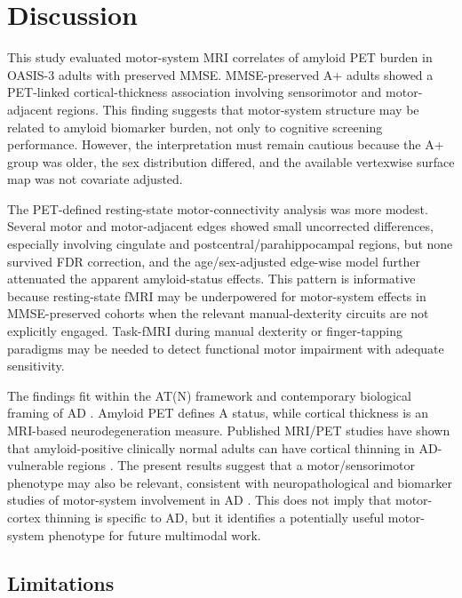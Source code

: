 \documentclass[review,3p,times,12pt,letterpaper]{elsarticle}
\begin{document}
\section{Discussion}

This study evaluated motor-system MRI correlates of amyloid PET burden in OASIS-3 adults with preserved MMSE. MMSE-preserved A+ adults showed a PET-linked cortical-thickness association involving sensorimotor and motor-adjacent regions. This finding suggests that motor-system structure may be related to amyloid biomarker burden, not only to cognitive screening performance. However, the interpretation must remain cautious because the A+ group was older, the sex distribution differed, and the available vertexwise surface map was not covariate adjusted.

The PET-defined resting-state motor-connectivity analysis was more modest. Several motor and motor-adjacent edges showed small uncorrected differences, especially involving cingulate and postcentral/parahippocampal regions, but none survived FDR correction, and the age/sex-adjusted edge-wise model further attenuated the apparent amyloid-status effects. This pattern is informative because resting-state fMRI may be underpowered for motor-system effects in MMSE-preserved cohorts when the relevant manual-dexterity circuits are not explicitly engaged. Task-fMRI during manual dexterity or finger-tapping paradigms may be needed to detect functional motor impairment with adequate sensitivity.

The findings fit within the AT(N) framework and contemporary biological framing of AD \cite{jack_jr_niaaa_2018,jack_revised_2024}. Amyloid PET defines A status, while cortical thickness is an MRI-based neurodegeneration measure. Published MRI/PET studies have shown that amyloid-positive clinically normal adults can have cortical thinning in AD-vulnerable regions \cite{dickerson_cortical_2009,becker_amyloid_2011}. The present results suggest that a motor/sensorimotor phenotype may also be relevant, consistent with neuropathological and biomarker studies of motor-system involvement in AD \cite{suva_primary_1999,gupta_biomarker_dexterity_2024,na_neural_basis_2025}. This does not imply that motor-cortex thinning is specific to AD, but it identifies a potentially useful motor-system phenotype for future multimodal work.

\subsection{Limitations}
\end{document}
